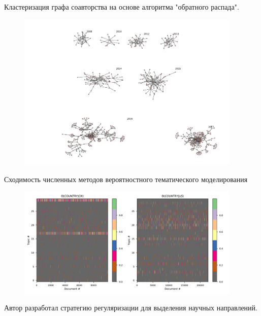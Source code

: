 \documentclass{beamer}
\begin{document}
\begin{frame}{Кластеризация графа соавторства на основе алгоритма "обратного распада".}
	\begin{figure}[!ht]
		\centering
		\includegraphics[width=0.95\textwidth]{media/guest3.png}
	\end{figure}
\end{frame}


\begin{frame}{Сходимость численных методов вероятностного тематического моделирования}
	\begin{figure}
		\begin{center}
			\includegraphics[width=0.95\textwidth]{media/op37fig3eng}
		\end{center}
	\end{figure}
	\begin{block}{}
		Автор разработал стратегию регуляризации для выделения научных направлений. 
	\end{block}
\end{frame}
\end{document}

